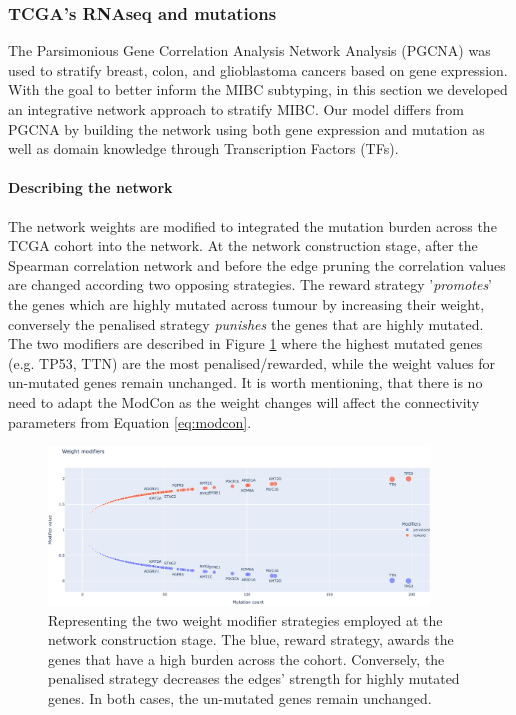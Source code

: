 \subsubsection{TCGA's RNAseq and mutations}


The Parsimonious Gene Correlation Analysis Network Analysis (PGCNA) was used to stratify breast, colon, and glioblastoma cancers \cite{Care2019-ij,Tanner2023-wa} based on gene expression. With the goal to better inform the MIBC subtyping, in this section we developed an integrative network approach to stratify MIBC. Our model differs from PGCNA by building the network using both gene expression and mutation as well as  domain knowledge through Transcription Factors (TFs).

\paragraph{Describing the network}

The network weights are modified to integrated the mutation burden across the TCGA cohort into the network. At the network construction stage, after the Spearman correlation network and before the edge pruning the correlation values are changed according two opposing strategies. The reward strategy '\textit{promotes}' the genes which are highly mutated across tumour by increasing their weight, conversely the penalised strategy \textit{punishes} the genes that are highly mutated. The two modifiers are described in Figure \ref{fig:N_I:modifiers} where the highest mutated genes (e.g. TP53, TTN) are the most penalised/rewarded, while the weight values for un-mutated genes remain unchanged. It is worth mentioning, that there is no need to adapt the ModCon as the weight changes will affect the connectivity parameters from Equation \ref{eq:modcon}.

\begin{figure}[!htb]    \centering\includegraphics[width=0.9\textwidth,height=0.9\textheight,keepaspectratio]{Sections/Network_I/Resources/Methods/modifiers.png}
    \caption{Representing the two weight modifier strategies employed at the network construction stage. The blue, reward strategy, awards the genes that have a high burden across the cohort. Conversely, the  penalised strategy decreases the edges' strength for highly mutated genes. In both cases, the un-mutated genes remain unchanged.}
    \label{fig:N_I:modifiers}
\end{figure}


